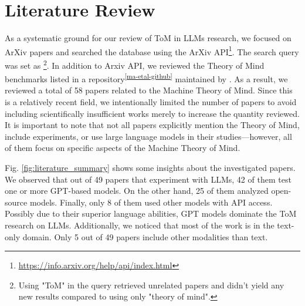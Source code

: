 \section{Literature Review}
\label{review}

\begin{figure*}[h]
    \centering
    \hspace{0.05\textwidth}
    \caption{Comparison of the number of papers inspecting different LLMs (left) and modalities (right).}
    \label{fig:literature_summary}
\end{figure*}

As a systematic ground for our review of ToM in LLMs research, we focused on ArXiv papers and searched the database using the ArXiv API\footnote{\url{https://info.arxiv.org/help/api/index.html}}. The search query was set as   \footnote{Using "ToM" in the query retrieved unrelated papers and didn’t yield any new results compared to using only "theory of mind".}.  In addition to Arxiv API, we reviewed the Theory of Mind benchmarks listed in a repository\textsuperscript{\ref{ma-etal-github}} maintained by \citet{ma-etal-2023-towards-holistic}.
As a result, we reviewed a total of 58 papers related to the Machine Theory of Mind. Since this is a relatively recent field, we intentionally limited the number of papers to avoid including scientifically insufficient works merely to increase the quantity reviewed.
It is important to note that not all papers explicitly mention the Theory of Mind, include experiments, or use large language models in their studies—however, all of them focus on specific aspects of the Machine Theory of Mind.

\begin{comment}
\begin{figure}[h]
    \centering
    \subfigure{
        \texttt{[image: figures/results\_year.pdf]}
    }
    \caption{Comparison of release years of papers retrieved from the Arxiv API.}
    \label{fig:api-years}
\end{figure}
\end{comment}

Fig. \ref{fig:literature_summary} shows some insights about the investigated papers. We observed that out of 49 papers that experiment with LLMs, 42 of them test one or more GPT-based models. On the other hand, 25 of them analyzed open-source models. Finally, only 8 of them used other models with API access. Possibly due to their superior language abilities, GPT models dominate the ToM research on LLMs. Additionally, we noticed that most of the work is in the text-only domain. Only 5 out of 49 papers include other modalities than text.

